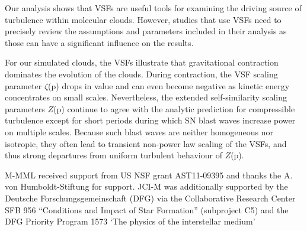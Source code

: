 \documentclass{aa}		%
\begin{document}
Our analysis shows that VSFs are useful tools for examining the driving source of turbulence within molecular clouds.
However, studies that use VSFs need to precisely review the assumptions and parameters included in their analysis as those can have a significant influence on the results.

For our simulated clouds, the VSFs illustrate that gravitational contraction dominates the evolution of the clouds.
During contraction, the VSF scaling parameter $\zeta$(p) drops in value and can even become negative as kinetic energy concentrates on small scales.
Nevertheless, the extended self-similarity scaling parameters $Z$(p) continue to agree with the analytic prediction for compressible turbulence except for short periods during which SN blast waves increase power on multiple scales.
Because such blast waves are neither homogeneous nor isotropic, they often lead to transient non-power law scaling of the VSFs, and thus strong departures from uniform turbulent behaviour of $Z$(p).

 
 	\begin{acknowledgements}
         	M-MML received support from US NSF grant AST11-09395 and thanks the A. von Humboldt-Stiftung for support.  
         	JCI-M was additionally supported by the Deutsche Forschungsgemeinschaft (DFG) via
the  Collaborative  Research  Center  SFB  956  ``Conditions and  Impact  of  Star  Formation'' (subproject  C5) and the  DFG  Priority  Program 1573 ‘The physics of the interstellar medium’
 	\end{acknowledgements}

 	
        
\end{document}

